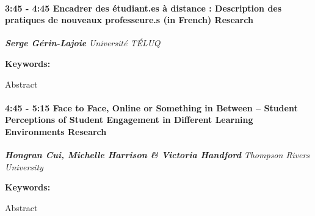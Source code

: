 \documentclass[
]{book}
\begin{document}
\begin{session}
\hypertarget{encadrer-des-uxe9tudiant.es-uxe0-distance-description-des-pratiques-de-nouveaux-professeure.s-in-french-research}{%
\paragraph*{\texorpdfstring{3:45 - 4:45 \textbar{} \textbf{Encadrer des
étudiant.es à distance : Description des pratiques de nouveaux
professeure.s (in French)} \textbar{}
Research}{3:45 - 4:45 \textbar{} Encadrer des étudiant.es à distance : Description des pratiques de nouveaux professeure.s (in French) \textbar{} Research}}\label{encadrer-des-uxe9tudiant.es-uxe0-distance-description-des-pratiques-de-nouveaux-professeure.s-in-french-research}}

\textbf{\emph{Serge Gérin-Lajoie}} \textbar{} \emph{Université TÉLUQ}

\textbf{Keywords:}

Abstract
\end{session}

\begin{session}
\hypertarget{face-to-face-online-or-something-in-between-student-perceptions-of-student-engagement-in-different-learning-environments-research}{%
\paragraph*{\texorpdfstring{4:45 - 5:15 \textbar{} \textbf{Face to Face,
Online or Something in Between -- Student Perceptions of Student
Engagement in Different Learning Environments} \textbar{}
Research}{4:45 - 5:15 \textbar{} Face to Face, Online or Something in Between -- Student Perceptions of Student Engagement in Different Learning Environments \textbar{} Research}}\label{face-to-face-online-or-something-in-between-student-perceptions-of-student-engagement-in-different-learning-environments-research}}

\textbf{\emph{Hongran Cui, Michelle Harrison \& Victoria Handford}}
\textbar{} \emph{Thompson Rivers University}

\textbf{Keywords:}

Abstract
\end{session}
\end{document}
